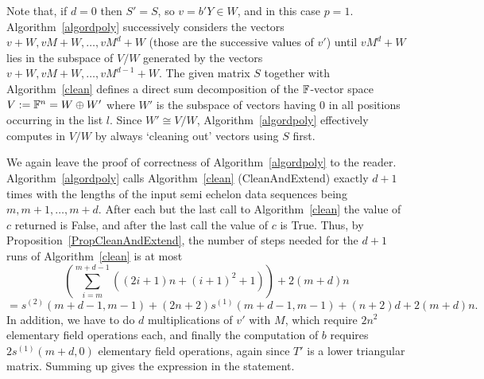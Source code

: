 \begin{Rem}
Note that, if $d=0$ then $S'=S$, so $v=b'Y\in W$, and in this case $p=1$. 
Algorithm~\ref{algordpoly} successively considers the vectors $v+W,
vM+W, \ldots, vM^d+W$  (those are the successive values of
$v'$) until $vM^d+W$ lies in the subspace of $V/W$ 
generated by the vectors $v+W, vM+W, \ldots, vM^{d-1}+W$. 
The given matrix $S$ together with Algorithm~\ref{clean} defines a
direct sum decomposition of the $\mathbb{F}$-vector space $V := \mathbb{F}^n = W \oplus W'$
where $W'$ is the subspace of vectors having $0$ in all positions
occurring in the list $l$. Since $W' \cong V/W$, 
Algorithm~\ref{algordpoly} effectively computes in $V/W$ by always `cleaning
out' vectors using $S$ first. 
\end{Rem}

We again leave the proof of correctness of Algorithm~\ref{algordpoly}
to the reader.
Algorithm~\ref{algordpoly} calls Algorithm~\ref{clean} ({\sc CleanAnd\-Extend}) exactly
$d+1$ times with the lengths of the input semi echelon data
sequences being $m,m+1, \ldots, m+d$. After each but the last call to
Algorithm~\ref{clean} the value of 
$c$ returned is {\sc False}, and after the last call the value of $c$ 
is {\sc True}. Thus, by
Proposition~\ref{PropCleanAndExtend}, the number of steps needed 
for the $d+1$ runs of Algorithm~\ref{clean} is at most
\[
\left(\sum_{i=m}^{m+d-1} ((2i+1)n+(i+1)^2+1)\right)  +  2(m+d)n  \]
\[
   = s^{(2)}(m+d-1,m-1) + (2n+2)s^{(1)}(m+d-1,m-1) + (n+2)d +2(m+d)n.
\]
In addition, we have to do $d$ multiplications of $v'$ with $M$, which require
$2n^2$ elementary field operations each, and finally the computation of $b$
requires $2s^{(1)}(m+d,0)$ elementary field operations, again since 
$T'$ is a lower triangular matrix. Summing up gives the expression in 
the statement. 
\proofend

